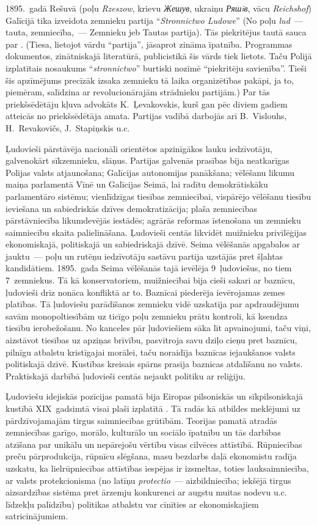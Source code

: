 \documentclass[twoside,a5paper,12pt,fleqn,openany]{extbook}
\newcommand{\pltxti}[1]{\textit{\textpolish{#1}}}
\newcommand{\rutxti}[1]{\textit{\textrussian{#1}}}
\newcommand{\detxti}[1]{\textit{\textgerman{#1}}}
\newcommand{\latxti}[1]{\textit{\textlatin{#1}}}
\newcommand{\uktxti}[1]{\textit{\textukrainian{#1}}}
\begin{document}
1895.~gadā Rešuvā (poļu \pltxti{Rzeszow}, krievu \rutxti{Жешув}, ukraiņu \uktxti{Ряшiв}, vācu \detxti{Reichshof}) Galīcijā tika izveidota zemnieku partija ``\pltxti{Stronnictwo Ludowe}'' (No poļu \pltxti{lud}~--- tauta, zemniecība,~--- Zemnieku jeb Tautas partija). Tās piekritējus tautā sauca par . (Tiesa, lietojot vārdu ``partija'', jāsaprot zināma īpatnība. Programmas dokumentos, zinātniskajā literatūrā, publicistikā šis vārds tiek lietots. Taču Polijā izplatītais nosaukums ``\pltxti{stronnictwo}'' burtiski nozīmē ``piekritēju savienība''. Tieši šis apzīmējums precīzāk izsaka zemnieku tā laika organizētības pakāpi, ja to, piemēram, salīdzina ar revolucionārajām strādnieku partijām.) Par tās priekšsēdētāju kļuva advokāts K.~Ļevakovskis, kurš gan pēc diviem gadiem atteicās no priekšsēdētāja amata. Partijas vadībā darbojās arī B.~Vislouhs, H.~Revakovičs, J.~Stapiņskis u.c.

Ļudovieši pārstāvēja nacionāli orientētos apzinīgākos lauku iedzīvotāju, galvenokārt sīkzemnieku, slāņus. Partijas galvenās prasības bija neatkarīgas Polijas valsts atjaunošana; Galīcijas autonomijas panākšana; vēlēšanu likumu maiņa parlamentā Vīnē un Galīcijas Seimā, lai radītu demokrātiskāku parlamentāro sistēmu; vienlīdzīgas tiesības zemniecībai, vispārējo vēlēšanu tiesību ieviešana un sabiedriskās dzīves demokratizācija; plaša zemniecības pārstāvniecība likumdevējās iestādēs; agrārās reformas īstenošana un zemnieku saimniecību skaita palielināšana. Ļudovieši centās likvidēt muižnieku privilēģijas ekonomiskajā, politiskajā un sabiedriskajā dzīvē. Seima vēlēšanās apgabalos ar jauktu~--- poļu un rutēņu iedzīvotāju sastāvu partija uzstājās pret šļahtas kandidātiem. 1895.~gada Seima vēlēšanās tajā ievēlēja 9~ļudoviešus, no tiem 7~zemniekus. Tā kā konservatoriem, muižniecībai bija cieši sakari ar baznīcu, ļudovieši drīz nonāca konfliktā ar to. Baznīcai piederēja ievērojamas zemes platības. Tā ļudoviešu parādīšanos zemnieku vidē uzskatīja par apdraudējumu savām monopoltiesībām uz ticīgo poļu zemnieku prātu kontroli, kā ksendza tiesību ierobežošanu. No kanceles pār ļudoviešiem sāka līt apvainojumi, taču viņi, aizstāvot tiesības uz apziņas brīvību, pasvītroja savu dziļo cieņu pret baznīcu, pilnīgu atbalstu kristīgajai morālei, taču noraidīja baznīcas iejaukšanos valsts politiskajā dzīvē. Kustības kreisais spārns prasīja baznīcas atdalīšanu no valsts. Praktiskajā darbībā ļudovieši centās nejaukt politiku ar reliģiju.

Ļudoviešu idejiskās pozīcijas pamatā bija Eiropas pilsoniskās un sīkpilsoniskajā kustībā XIX~gadsimtā visai plaši izplatītā . Tā radās kā atbildes meklējumi uz pārdzīvojamajām tirgus saimniecības grūtībām. Teorijas pamatā atradās zemniecības garīgo, morālo, kulturālo un sociālo īpatnību un tās darbības atzīšana par unikālu un nepārejošu vērtību visas cilvēces attīstībā. Rūpniecības preču pārprodukcija, rūpnīcu slēgšana, masu bezdarbs daļā ekonomistu radīja uzskatu, ka lielrūpniecības attīstības iespējas ir izsmeltas, toties lauksaimniecība, ar valsts protekcionisma (no latīņu \latxti{protectio}~--- aizbildniecība; iekšējā tirgus aizsardzības sistēma pret ārzemju konkurenci ar augstu muitas nodevu u.c. līdzekļu palīdzību) politikas atbalstu var cīnīties ar ekonomiskajiem satricinājumiem.
\end{document}
